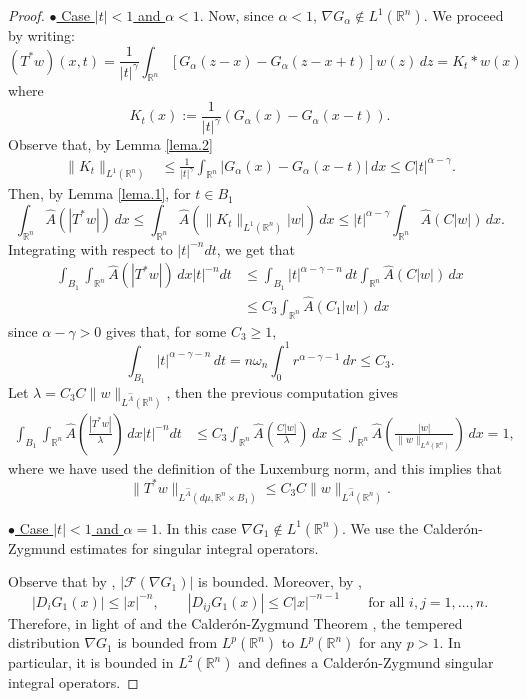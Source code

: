 \documentclass[leqno,twoside, 12pt]{amsart}
\theoremstyle{plain}
\numberwithin{equation}{section} \numberwithin{figure}{section}
\theoremstyle{definition}
\newcommand{\R}{\mathbb R}
\numberwithin{equation}{section}
\begin{document}
\begin{proof}
\medskip
\noindent \underline{$\bullet$ Case $|t|<1$ and $\alpha<1$}.  Now, since $\alpha <1$, $\nabla G_\alpha\notin L^1(\R^n)$. We proceed by writing:
$$
(T^*w)(x,t) = \frac{1}{|t|^\gamma} \int_{\mathbb{R}^n} [G_\alpha(z-x) - G_\alpha(z-x+t)] w(z) \, dz = K_t* w(x)
$$
where
$$
K_t(x):=\frac{1}{|t|^\gamma}(G_\alpha(x)-G_\alpha(x-t)).
$$
Observe that, by Lemma \ref{lema.2}
\begin{align*}
\|K_t\|_{L^1(\R^n)} &\leq \frac{1}{|t|^\gamma}\int_{\R^n} |G_\alpha(x)-G_\alpha(x-t)|\,dx \leq C|t|^{\alpha-\gamma}.
\end{align*}
Then, by Lemma \ref{lema.1}, for $t\in B_1$
$$
\int_{\R^n} \hat A(|T^* w|)\,dx \leq \int_{\R^n}\hat A(\|K_t\|_{L^1(\R^n)} |w|)\,dx \leq |t|^{\alpha-\gamma} \int_{\R^n}\hat A(C|w|)\,dx.
$$
 Integrating with respect to $|t|^{-n}dt$, we get that
 \begin{align*}
\int_{B_1}\int_{\R^n} \hat A(|T^* w|)\,dx|t|^{-n}dt &\leq  \int_{B_1}|t|^{\alpha-\gamma-n}\,dt \int_{\R^n} \hat A(C|w|)\,dx  \\
&\leq  C_3\int_{\R^n}\hat A(C_1 |w|)\,dx  
 \end{align*}
 since $\alpha-\gamma>0$ gives that, for some $C_3\geq 1$,
 $$
 \int_{B_1}|t|^{\alpha-\gamma-n}\,dt = n\omega_n\int_0^1 r^{\alpha-\gamma-1}\,dr\leq C_3.
 $$
 Let $\lambda =C_3 C \|w\|_{L^{\hat A}(\R^n)}$, then the previous computation gives
  \begin{align*}
 \int_{B_1}\int_{\R^n} \hat A\left(\frac{|T^* w|}{\lambda}\right)\,dx|t|^{-n}dt 
 &\leq C_3 \int_{\R^n}\hat A\left(\frac{C|w|}{\lambda}\right)\,dx \leq 
  \int_{\R^n}\hat A\left(\frac{|w|}{\|w\|_{L^A(\R^n)}}\right)\,dx=1,
  \end{align*}
  where we have used the definition of the Luxemburg norm, and this implies that
\begin{equation} \label{cota.t.2}
 \|T^*w\|_{L^{\hat{A}}(d\mu, \mathbb{R}^n \times B_1 )} \leq C_3C \|w\|_{L^{\hat A}(\R^n)}.
\end{equation}
 
 
\medskip
\noindent \underline{$\bullet$ Case $|t|<1$ and $\alpha=1$}. 
 In this case $\nabla G_1\not\in L^1(\R^n)$. We use the  Calder\'on-Zygmund estimates for singular integral operators. 
 
 Observe that by \cite[(5.6)]{AS}, $|\mathcal{F}(\nabla G_1)|$ is bounded.  Moreover, by \cite[(9.2)]{AS}, 
 $$
 |D_i G_1(x)|\leq |x|^{-n}, \qquad |D_{ij} G_1(x)| \leq C |x|^{-n-1} \qquad \text{for all }i,j=1,\ldots, n.
 $$
 Therefore, in light of  \cite[Theorem 5.2]{D} and the Calder\'on-Zygmund Theorem  \cite[Theorem 5.1]{D}, the tempered distribution $\nabla G_1$ is bounded from $L^p(\R^n)$ to $L^p(\R^n)$ for any $p>1$. In particular, it is bounded in $L^2(\R^n)$ and defines a Calder\'on-Zygmund singular integral operators. 
 

\end{proof}
\end{document}
